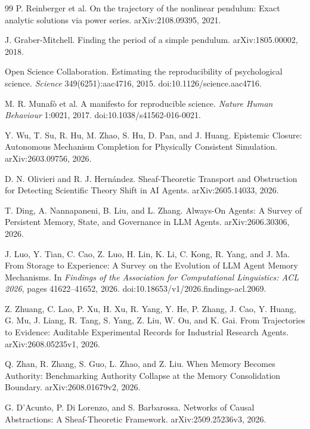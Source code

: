 \documentclass[11pt]{article}
\begin{document}
\begin{thebibliography}{99}
 P. Reinberger et al. On the trajectory of the nonlinear pendulum: Exact analytic solutions via power series. arXiv:2108.09395, 2021.

 J. Graber-Mitchell. Finding the period of a simple pendulum. arXiv:1805.00002, 2018.

 Open Science Collaboration. Estimating the reproducibility of psychological science. \emph{Science} 349(6251):aac4716, 2015. doi:10.1126/science.aac4716.

 M. R. Munaf\`o et al. A manifesto for reproducible science. \emph{Nature Human Behaviour} 1:0021, 2017. doi:10.1038/s41562-016-0021.

 Y. Wu, T. Su, R. Hu, M. Zhao, S. Hu, D. Pan, and J. Huang. Epistemic Closure: Autonomous Mechanism Completion for Physically Consistent Simulation. arXiv:2603.09756, 2026.

 D. N. Olivieri and R. J. Hern\'andez. Sheaf-Theoretic Transport and Obstruction for Detecting Scientific Theory Shift in AI Agents. arXiv:2605.14033, 2026.

 T. Ding, A. Nannapaneni, B. Liu, and L. Zhang. Always-On Agents: A Survey of Persistent Memory, State, and Governance in LLM Agents. arXiv:2606.30306, 2026.

 J. Luo, Y. Tian, C. Cao, Z. Luo, H. Lin, K. Li, C. Kong, R. Yang, and J. Ma. From Storage to Experience: A Survey on the Evolution of LLM Agent Memory Mechanisms. In \emph{Findings of the Association for Computational Linguistics: ACL 2026}, pages 41622--41652, 2026. doi:10.18653/v1/2026.findings-acl.2069.

 Z. Zhuang, C. Lao, P. Xu, H. Xu, R. Yang, Y. He, P. Zhang, J. Cao, Y. Huang, G. Mu, J. Liang, R. Tang, S. Yang, Z. Liu, W. Ou, and K. Gai. From Trajectories to Evidence: Auditable Experimental Records for Industrial Research Agents. arXiv:2608.05235v1, 2026.

 Q. Zhan, R. Zhang, S. Guo, L. Zhao, and Z. Liu. When Memory Becomes Authority: Benchmarking Authority Collapse at the Memory Consolidation Boundary. arXiv:2608.01679v2, 2026.

 G. D'Acunto, P. Di Lorenzo, and S. Barbarossa. Networks of Causal Abstractions: A Sheaf-Theoretic Framework. arXiv:2509.25236v3, 2026.

\end{thebibliography}
\end{document}
